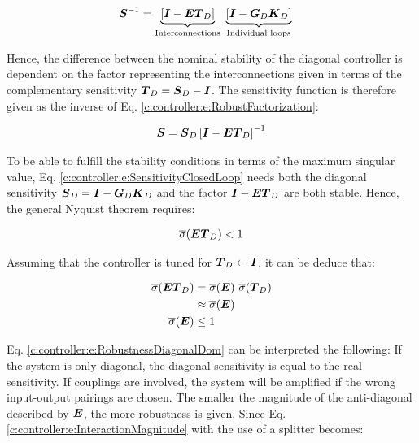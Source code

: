 \begin{align}
\begin{split}
\mbox{\boldmath$S$}^{-1} &=\underbrace{\left[\mbox{\boldmath$I$} - \mbox{\boldmath$E$} \mbox{\boldmath$T$}_D \right]}_{\text{Interconnections}} ~ \underbrace{\left[ \mbox{\boldmath$I$} - \mbox{\boldmath$G$}_D \mbox{\boldmath$K$}_D \right]}_{\text{Individual loops}} 
\end{split}
\label{c:controller:e:RobustFactorization}
\end{align}

Hence, the difference between the nominal stability of the diagonal controller is dependent on the factor representing the interconnections given in terms of the complementary sensitivity $\mbox{\boldmath$T$}_D = \mbox{\boldmath$S$}_D - \mbox{\boldmath$I$} $. The sensitivity function is therefore given as the inverse of Eq. \ref{c:controller:e:RobustFactorization}:

\begin{align}
\mbox{\boldmath$S$} = \mbox{\boldmath$S$}_D \left[\mbox{\boldmath$I$} - \mbox{\boldmath$E$} \mbox{\boldmath$T$}_D \right]^{-1}
\label{c:controller:e:SensitivityClosedLoop}
\end{align}

To be able to fulfill the stability conditions in terms of the maximum singular value, Eq. \ref{c:controller:e:SensitivityClosedLoop} needs both the diagonal sensitivity $\mbox{\boldmath$S$}_D =  \mbox{\boldmath$I$} - \mbox{\boldmath$G$}_D \mbox{\boldmath$K$}_D$ and the factor $\mbox{\boldmath$I$} - \mbox{\boldmath$E$} \mbox{\boldmath$T$}_D$ are both stable. Hence, the general Nyquist theorem requires:

\begin{align}
\overline{\sigma}(\mbox{\boldmath$E$}\mbox{\boldmath$T$}_D) < 1
\end{align}

Assuming that the controller is tuned for $\mbox{\boldmath$T$}_D \leftarrow \mbox{\boldmath$I$}$, it can be deduce that:

\begin{align}
\begin{split}
\overline{\sigma}(\mbox{\boldmath$E$}\mbox{\boldmath$T$}_D) &= \overline{\sigma}(\mbox{\boldmath$E$})~\overline{\sigma}(\mbox{\boldmath$T$}_D) \\
&\approx \overline{\sigma}(\mbox{\boldmath$E$}) \\
\overline{\sigma}(\mbox{\boldmath$E$}) &\leq 1
\end{split}
\label{c:controller:e:RobustnessDiagonalDom}
\end{align}

Eq. \ref{c:controller:e:RobustnessDiagonalDom} can be interpreted the following: If the system is only diagonal, the diagonal sensitivity is equal to the real sensitivity. If couplings are involved, the system will be amplified if the wrong input-output pairings are chosen. The smaller the magnitude of the anti-diagonal described by $\mbox{\boldmath$E$}$, the more robustness is given. Since Eq.\ref{c:controller:e:InteractionMagnitude} with the use of a splitter becomes:


